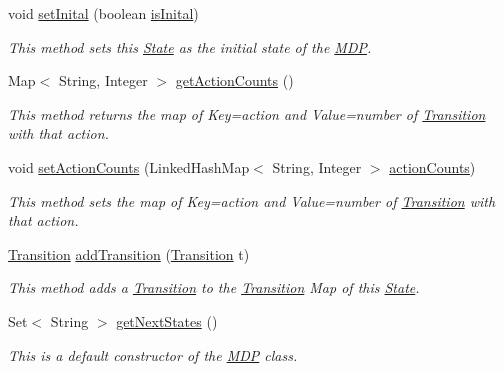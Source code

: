 \begin{DoxyCompactItemize}
void \hyperlink{classmdp_1_1core_1_1_state_a5bee145159ba3ab3bf501682a7d98d01}{set\+Inital} (boolean \hyperlink{classmdp_1_1core_1_1_state_a06eb4d38e11e4be71c5e072fe9f9bee3}{is\+Inital})
\begin{DoxyCompactList}\small\item\em This method sets this \hyperlink{classmdp_1_1core_1_1_state}{State} as the initial state of the \hyperlink{classmdp_1_1core_1_1_m_d_p}{M\+D\+P}. \end{DoxyCompactList}\item 
Map$<$ String, Integer $>$ \hyperlink{classmdp_1_1core_1_1_state_a14947bea4d426d7b8665be0f07ed20c0}{get\+Action\+Counts} ()
\begin{DoxyCompactList}\small\item\em This method returns the map of Key=action and Value=number of \hyperlink{classmdp_1_1core_1_1_transition}{Transition} with that action. \end{DoxyCompactList}\item 
void \hyperlink{classmdp_1_1core_1_1_state_aab391f1b09decdee9e3b74a51ad31520}{set\+Action\+Counts} (Linked\+Hash\+Map$<$ String, Integer $>$ \hyperlink{classmdp_1_1core_1_1_state_a56e17de2fde7a7f4ee8b1491c11438d5}{action\+Counts})
\begin{DoxyCompactList}\small\item\em This method sets the map of Key=action and Value=number of \hyperlink{classmdp_1_1core_1_1_transition}{Transition} with that action. \end{DoxyCompactList}\item 
\hyperlink{classmdp_1_1core_1_1_transition}{Transition} \hyperlink{classmdp_1_1core_1_1_state_acc75ae62e5e0fe543bf49b616f88359c}{add\+Transition} (\hyperlink{classmdp_1_1core_1_1_transition}{Transition} t)
\begin{DoxyCompactList}\small\item\em This method adds a \hyperlink{classmdp_1_1core_1_1_transition}{Transition} to the \hyperlink{classmdp_1_1core_1_1_transition}{Transition} Map of this \hyperlink{classmdp_1_1core_1_1_state}{State}. \end{DoxyCompactList}\item 
Set$<$ String $>$ \hyperlink{classmdp_1_1core_1_1_state_afa42873a5a6554333a18a052ec52f59e}{get\+Next\+States} ()
\begin{DoxyCompactList}\small\item\em This is a default constructor of the \hyperlink{classmdp_1_1core_1_1_m_d_p}{M\+D\+P} class. \end{DoxyCompactList}\item 

\end{DoxyCompactItemize}

